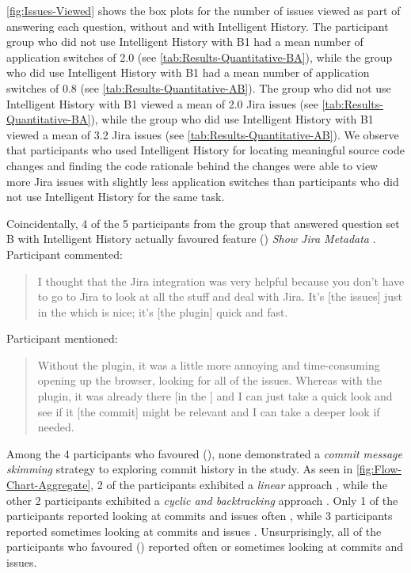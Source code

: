\autoref{fig:Issues-Viewed} shows the box plots for the number of issues viewed as part of answering each question,
without and with Intelligent History.
The participant group who did not use Intelligent History with B1 had 
a mean number of application switches of 2.0 (see \autoref{tab:Results-Quantitative-BA}),
while the group who did use Intelligent History with B1 had 
a mean number of application switches of 0.8 (see \autoref{tab:Results-Quantitative-AB}).
The group who did not use Intelligent History with B1 viewed 
a mean of 2.0 Jira issues (see \autoref{tab:Results-Quantitative-BA}),
while the group who did use Intelligent History with B1 viewed 
a mean of 3.2 Jira issues (see \autoref{tab:Results-Quantitative-AB}).
We observe that participants who used Intelligent History for locating meaningful source code changes and finding the code rationale behind the changes
were able to view more Jira issues with slightly less application switches than participants who did not use Intelligent History for the same task.

Coincidentally, 4 of the 5 participants from the group that answered question set B with 
Intelligent History actually favoured feature () \textit{Show Jira Metadata} .
Participant  commented:

\begin{quote}
  I thought that the Jira integration was very helpful because you don’t have to go to Jira to look at all the stuff and deal with Jira. 
  It’s [the issues] just in the  which is nice; it’s [the plugin] quick and fast.
\end{quote}

Participant  mentioned:

\begin{quote}
  Without the plugin, it was a little more annoying and time-consuming opening up the browser, 
  looking for all of the issues. 
  Whereas with the plugin, 
  it was already there [in the ] and I can just take a quick look and see if it [the commit] 
  might be relevant and I can take a deeper look if needed.
\end{quote}

Among the 4 participants who favoured (), none demonstrated a 
\textit{commit message skimming} strategy to exploring commit history in the study.
As seen in \autoref{fig:Flow-Chart-Aggregate}, 2 of the participants exhibited 
a \textit{linear} approach , 
while the other 2 participants exhibited a \textit{cyclic and backtracking} approach .
Only 1 of the participants reported looking at commits and issues often ,
while 3 participants reported sometimes looking at commits and issues .
Unsurprisingly, all of the participants who favoured () 
reported often or sometimes looking at commits and issues.

